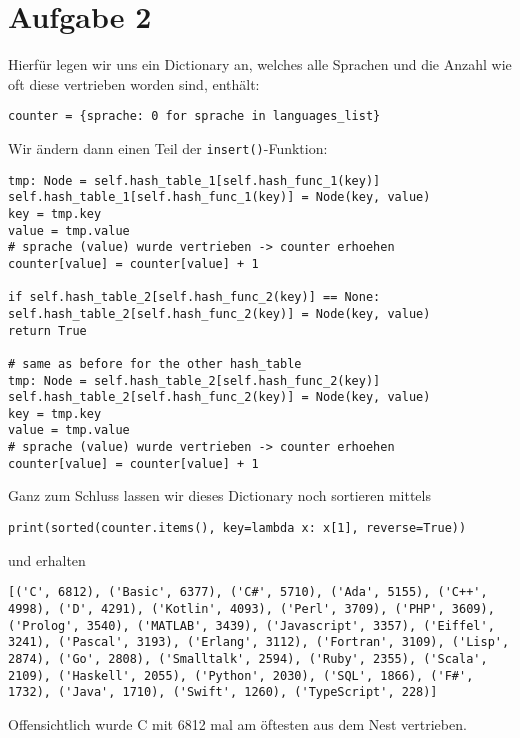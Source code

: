 \documentclass{article}
\begin{document}
	\section*{Aufgabe 2}
	Hierfür legen wir uns ein Dictionary an, welches alle Sprachen und die Anzahl wie oft diese vertrieben worden sind, enthält:
	\begin{lstlisting}[style=python,tabsize=2]
counter = {sprache: 0 for sprache in languages_list}
	\end{lstlisting}
	Wir ändern dann einen Teil der \texttt{insert()}-Funktion:
	\begin{lstlisting}[style=python,tabsize=2]
tmp: Node = self.hash_table_1[self.hash_func_1(key)]
self.hash_table_1[self.hash_func_1(key)] = Node(key, value)
key = tmp.key
value = tmp.value
# sprache (value) wurde vertrieben -> counter erhoehen
counter[value] = counter[value] + 1

if self.hash_table_2[self.hash_func_2(key)] == None:
self.hash_table_2[self.hash_func_2(key)] = Node(key, value)
return True

# same as before for the other hash_table
tmp: Node = self.hash_table_2[self.hash_func_2(key)]
self.hash_table_2[self.hash_func_2(key)] = Node(key, value)
key = tmp.key
value = tmp.value
# sprache (value) wurde vertrieben -> counter erhoehen
counter[value] = counter[value] + 1
	\end{lstlisting}
	Ganz zum Schluss lassen wir dieses Dictionary noch sortieren mittels
	\begin{lstlisting}[style=python,tabsize=2]
print(sorted(counter.items(), key=lambda x: x[1], reverse=True))
	\end{lstlisting}
	und erhalten
	\begin{lstlisting}[style=python]
[('C', 6812), ('Basic', 6377), ('C#', 5710), ('Ada', 5155), ('C++', 4998), ('D', 4291), ('Kotlin', 4093), ('Perl', 3709), ('PHP', 3609), ('Prolog', 3540), ('MATLAB', 3439), ('Javascript', 3357), ('Eiffel', 3241), ('Pascal', 3193), ('Erlang', 3112), ('Fortran', 3109), ('Lisp', 2874), ('Go', 2808), ('Smalltalk', 2594), ('Ruby', 2355), ('Scala', 2109), ('Haskell', 2055), ('Python', 2030), ('SQL', 1866), ('F#', 1732), ('Java', 1710), ('Swift', 1260), ('TypeScript', 228)]
	\end{lstlisting}
	Offensichtlich wurde C mit 6812 mal am öftesten aus dem Nest vertrieben.
	
\end{document}
